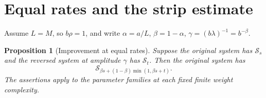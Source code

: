 \documentclass[11pt,a4paper]{article}
\newtheorem{proposition}[theorem]{Proposition}
\begin{document}
\section{Equal rates and the strip estimate}\label{sec:equal}

Assume $L=M$, so $b\rho=1$, and write
$\alpha=a/L$, $\beta=1-\alpha$, $\gamma=(b\lambda)^{-1}=b^{-\beta}$.
\begin{proposition}[Improvement at equal rates]\label{prop:strip}
Suppose the original system has $\mathcal S_s$ and the reversed
system at amplitude $\gamma$ has $\mathcal S_t$. Then the original
system has
\[
 \mathcal S_{\beta s+(1-\beta)\min(1,\beta s+t)}.               \tag{B1}
\]
The assertions apply to the parameter families at each fixed finite
weight complexity.
\end{proposition}
\end{document}
